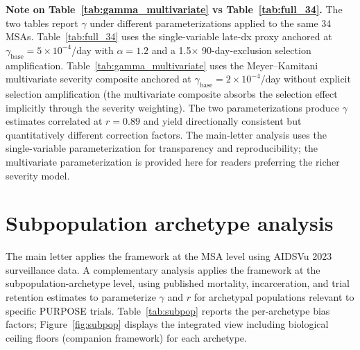 \documentclass[11pt]{article}
\begin{document}
\textbf{Note on Table~\ref{tab:gamma_multivariate} vs Table~\ref{tab:full_34}.} The two tables report $\gamma$ under different parameterizations applied to the same 34 MSAs. Table~\ref{tab:full_34} uses the single-variable late-dx proxy anchored at $\gamma_{\mathrm{base}} = 5 \times 10^{-4}$/day with $\alpha = 1.2$ and a 1.5$\times$ 90-day-exclusion selection amplification. Table~\ref{tab:gamma_multivariate} uses the Meyer--Kamitani multivariate severity composite anchored at $\gamma_{\mathrm{base}} = 2 \times 10^{-4}$/day without explicit selection amplification (the multivariate composite absorbs the selection effect implicitly through the severity weighting). The two parameterizations produce $\gamma$ estimates correlated at $r = 0.89$ and yield directionally consistent but quantitatively different correction factors. The main-letter analysis uses the single-variable parameterization for transparency and reproducibility; the multivariate parameterization is provided here for readers preferring the richer severity model.

\section{Subpopulation archetype analysis}

\label{sec:subpop}

The main letter applies the framework at the MSA level using AIDSVu 2023 surveillance data. A complementary analysis applies the framework at the subpopulation-archetype level, using published mortality, incarceration, and trial retention estimates to parameterize $\gamma$ and $r$ for archetypal populations relevant to specific PURPOSE trials. Table~\ref{tab:subpop} reports the per-archetype bias factors; Figure~\ref{fig:subpop} displays the integrated view including biological ceiling floors (companion framework) for each archetype.
\end{document}

